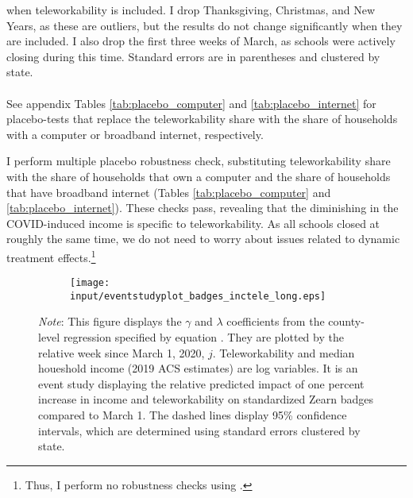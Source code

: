 \begin{table}[hbtp!]
\begin{minipage}{\textwidth}
      when teleworkability is included.
      I drop Thanksgiving, Christmas, and New Years, as these are outliers, but the results do not change significantly when they are included.
      I also drop the first three weeks of March, as schools were actively closing during this time.
      Standard errors are in parentheses and clustered by state.
        \\ \\
        See appendix Tables \ref{tab:placebo_computer} and \ref{tab:placebo_internet} for placebo-tests that replace the teleworkability share with the share of households with a computer or broadband internet, respectively.
  \end{minipage}
\end{table}
I perform multiple placebo robustness check, substituting teleworkability share with the share of households that own a computer and the share of households that have broadband internet (Tables \ref{tab:placebo_computer} and \ref{tab:placebo_internet}).
These checks pass, revealing that the diminishing in the COVID-induced income is specific to teleworkability.
As all schools closed at roughly the same time, we do not need to worry about issues related to dynamic treatment effects.\footnote{Thus, I perform no robustness checks using \cite{sun}.}

\begin{figure}[hbtp!]
  \caption{The relative importance of teleworkability compared to income increased in the previous summer, and COVID shifted this effect forward in 2020}
  \label{fig:badges_seasonal}
    \centering
    \begin{subfigure}[t]{0.6\textwidth}
        \centering
        \texttt{[image: input/eventstudyplot\_badges\_inctele\_long.eps]}
    \end{subfigure}%

    \begin{minipage}{\textwidth}
        {\footnotesize
        \textit{Note}: This figure displays the $\gamma$ and $\lambda$ coefficients from the county-level regression specified by equation .
        They are plotted by the relative week since March 1, 2020, $j$.
        Teleworkability \citep{dingel} and median houeshold income (2019 ACS estimates) are log variables.
        It is an event study displaying the relative predicted impact of one percent increase in income and teleworkability on standardized Zearn badges compared to March 1.
        The dashed lines display 95\% confidence intervals,
        which are determined using standard errors clustered by state.
        }
  \end{minipage}
\end{figure}


